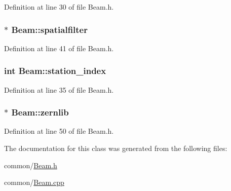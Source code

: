 Definition at line 30 of file Beam.h.

\hypertarget{classBeam_a68bc1a7abd201297114cd53af925f83f}{
\subsubsection[{spatialfilter}]{$\ast$ {\bf Beam::spatialfilter}}}
\label{classBeam_a68bc1a7abd201297114cd53af925f83f}


Definition at line 41 of file Beam.h.

\hypertarget{classBeam_ae589b08d6d0d638c18a15880efc521d2}{
\subsubsection[{station\_\-index}]{\setlength{\rightskip}{0pt plus 5cm}int {\bf Beam::station\_\-index}}}
\label{classBeam_ae589b08d6d0d638c18a15880efc521d2}


Definition at line 35 of file Beam.h.

\hypertarget{classBeam_ad41f9e0d00cfe3ed0e5a22a2f3e7c399}{
\subsubsection[{zernlib}]{$\ast$ {\bf Beam::zernlib}}}
\label{classBeam_ad41f9e0d00cfe3ed0e5a22a2f3e7c399}


Definition at line 50 of file Beam.h.



The documentation for this class was generated from the following files:\begin{DoxyCompactItemize}
\item 
common/\hyperlink{Beam_8h}{Beam.h}\item 
common/\hyperlink{Beam_8cpp}{Beam.cpp}\end{DoxyCompactItemize}
